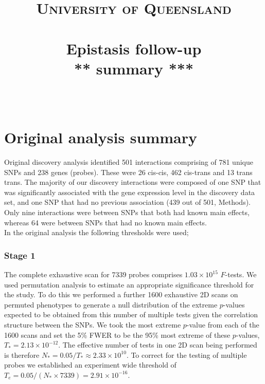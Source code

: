 \documentclass[paper=a4, fontsize=11pt]{scrartcl}					%
\title{
		\usefont{OT1}{bch}{b}{n}
		\normalfont \normalsize \textsc{University of Queensland} \\ [25pt]
		\horrule{0.5pt} \\[0.4cm]
		\huge Epistasis follow-up \\[0.3cm]
        \huge *** summary *** \\
		\horrule{2pt} \\[0.5cm]
		\date{}
}
\numberwithin{equation}{section}									%
\numberwithin{figure}{section}										%
\numberwithin{table}{section}										%
\begin{document}


\maketitle



\newpage
\section*{Original analysis summary}
\noindent


Original discovery analysis identified 501 interactions comprising of 781 unique SNPs and 238 genes (probes). These were 26 cis-cis, 462 cis-trans and 13 trans trans. The majority of our discovery interactions were composed of one SNP that was significantly associated with the gene expression level in the discovery data set, and one SNP that had no previous association (439 out of 501, Methods). Only nine interactions were between SNPs that both had known main effects, whereas 64 were between SNPs that had no known main effects. \\

In the original analysis the following thresholds were used; \\

\subsubsection*{Stage 1}
 
The complete exhaustive scan for 7339 probes comprises $1.03 \times 10^{15}$ $F$-tests. We used permutation analysis to estimate an appropriate significance threshold for the study. To do this we performed a further 1600 exhaustive 2D scans on permuted phenotypes to generate a null distribution of the extreme $p$-values expected to be obtained from this number of multiple tests given the correlation structure between the SNPs. We took the most extreme $p$-value from each of the 1600 scans and set the 5\% FWER to be the 95\% most extreme of these $p$-values, $T_{*} = 2.13 \times 10^{-12}$. The effective number of tests in one 2D scan being performed is therefore $N_{*} = 0.05 / T_{*} \approx 2.33 \times 10^{10}$. To correct for the testing of multiple probes we established an experiment wide threshold of $T_{e} = 0.05 / (N_{*} \times 7339) = 2.91 \times 10^{-16}$. 
\end{document}
